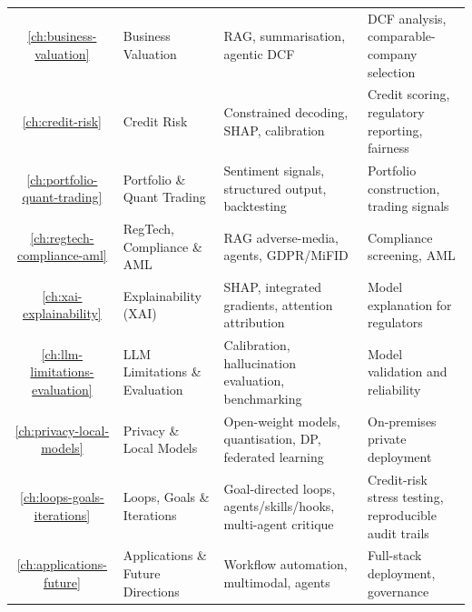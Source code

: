 \begin{table}[htbp]
\begin{tabularx}{\linewidth}{c l X X}
\ref{ch:business-valuation} & Business Valuation
  & RAG, summarisation, agentic DCF
  & DCF analysis, comparable-company selection \\[3pt]
\ref{ch:credit-risk} & Credit Risk
  & Constrained decoding, SHAP, calibration
  & Credit scoring, regulatory reporting, fairness \\[3pt]
\ref{ch:portfolio-quant-trading} & Portfolio \& Quant Trading
  & Sentiment signals, structured output, backtesting
  & Portfolio construction, trading signals \\[3pt]
\ref{ch:regtech-compliance-aml} & RegTech, Compliance \& AML
  & RAG adverse-media, agents, GDPR/MiFID
  & Compliance screening, AML \\[3pt]
\ref{ch:xai-explainability} & Explainability (XAI)
  & SHAP, integrated gradients, attention attribution
  & Model explanation for regulators \\[3pt]
\ref{ch:llm-limitations-evaluation} & LLM Limitations \& Evaluation
  & Calibration, hallucination evaluation, benchmarking
  & Model validation and reliability \\[3pt]
\ref{ch:privacy-local-models} & Privacy \& Local Models
  & Open-weight models, quantisation, DP, federated learning
  & On-premises private deployment \\[3pt]
\ref{ch:loops-goals-iterations} & Loops, Goals \& Iterations
  & Goal-directed loops, agents/skills/hooks, multi-agent critique
  & Credit-risk stress testing, reproducible audit trails \\[3pt]
\ref{ch:applications-future} & Applications \& Future Directions
  & Workflow automation, multimodal, agents
  & Full-stack deployment, governance \\
\bottomrule
\end{tabularx}
\end{table}

